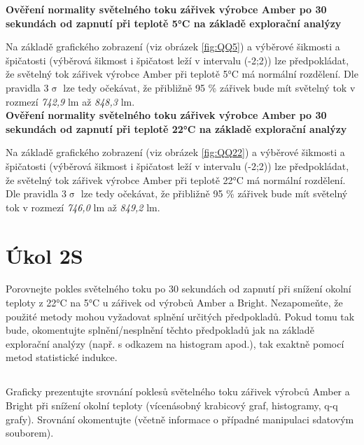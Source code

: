 \documentclass[czech]{article}%
\begin{document}
\textbf{Ověření normality světelného toku zářivek výrobce Amber po 30 sekundách od zapnutí při teplotě 5°C na základě explorační analýzy}

Na základě grafického zobrazení (viz obrázek \ref{fig:QQ5}) a výběrové šikmosti a špičatosti (výběrová šikmost i špičatost leží v intervalu (-2;2)) 
lze předpokládat, že světelný tok zářivek výrobce Amber při teplotě 5°C má normální rozdělení. Dle pravidla 3$\upsigma$ 
lze tedy očekávat, že přibližně 95 \% zářivek bude mít světelný tok v rozmezí \textit{742,9} lm až \textit{848,3} lm.\\


\textbf{Ověření normality světelného toku zářivek výrobce Amber po 30 sekundách od zapnutí při teplotě 22°C na základě explorační analýzy}

Na základě grafického zobrazení (viz obrázek \ref{fig:QQ22}) a výběrové šikmosti a špičatosti (výběrová šikmost i špičatost leží v intervalu (-2;2)) 
lze předpokládat, že světelný tok zářivek výrobce Amber při teplotě 22°C má normální rozdělení. Dle pravidla 3$\upsigma$ 
lze tedy očekávat, že přibližně 95 \% zářivek bude mít světelný tok v rozmezí \textit{746,0} lm až \textit{849,2} lm.\\


\newpage
\section{Úkol 2S}
Porovnejte pokles světelného toku po 30 sekundách od zapnutí při snížení okolní teploty z 22°C 
na 5°C u zářivek od výrobců Amber a Bright. Nezapomeňte, že použité metody mohou vyžadovat 
splnění určitých předpokladů. Pokud tomu tak bude, okomentujte splnění/nesplnění těchto předpokladů 
jak na základě explorační analýzy (např. s odkazem na histogram apod.), tak exaktně pomocí metod statistické indukce.


\subsection{}
Graficky prezentujte srovnání poklesů světelného toku zářivek výrobců Amber a Bright 
při snížení okolní teploty (vícenásobný krabicový graf, histogramy, q-q grafy). 
Srovnání okomentujte (včetně informace o případné manipulaci sdatovým souborem).
\end{document}
